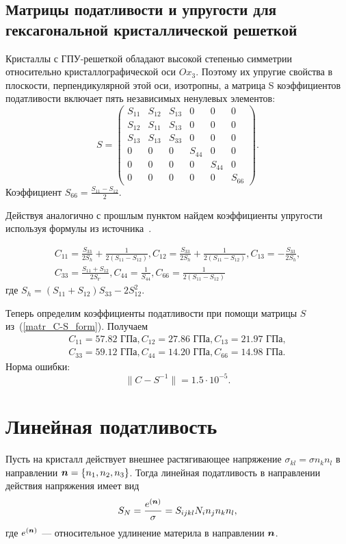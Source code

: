 \documentclass[12pt, a4paper]{article}
\renewcommand{\vec}[1]{\text{\mathversion{bold}${#1}$}}%
\begin{document}
\subsection{Матрицы податливости и упругости для гексагональной кристаллической решеткой}
 
Кристаллы с ГПУ-решеткой обладают высокой степенью симметрии относительно кристаллографической оси $Ox_3$. Поэтому их упругие свойства в плоскости, перпендикулярной этой оси, изотропны, а матрица S коэффициентов податливости включает пять независимых ненулевых элементов:
\[
S=
\begin{pmatrix}
	S_{11} & S_{12} & S_{13} & 0 & 0 & 0\\
	S_{12} & S_{11} & S_{13} & 0 & 0 & 0\\
	S_{13} & S_{13} & S_{33} & 0 & 0 & 0\\
	0 & 0 & 0 & S_{44} & 0 & 0\\
	0 & 0 & 0 & 0 & S_{44} & 0\\
	0 & 0 & 0 & 0 & 0 & S_{66} 
\end{pmatrix}.  
\]
Коэффициент $S_{66} = \frac{S_{11} - S_{12}}{2}$.

Действуя аналогично с прошлым пунктом найдем коэффициенты упругости используя формулы из источника~\cite{first-zarubin}.

\begin{gather*}
	C_{11} = \frac{S_{33}}{2 S_{h}} + \frac{1}{2 \left( S_{11} - S_{12} \right)}, 
	C_{12} = \frac{S_{33}}{2 S_{h}} + \frac{1}{2 \left( S_{11} - S_{12} \right)},
	C_{13} = -\frac{S_{33}}{2 S_{h}},\\
	C_{33} = \frac{S_{11} + S_{12}}{2 S_{Г}},
	C_{44} = \frac{1}{S_{44}},
	C_{66} = \frac{1}{2 \left( S_{11} - S_{12} \right)
	}
\end{gather*}
где $S_h = \left(S_{11} + S_{12}\right) S_{33} - 2 S_{12}^2$.

Теперь определим коэффициенты податливости при помощи матрицы $S$ из~(\ref{matr_C-S_form}). Получаем 
\begin{gather*}
	C_{11} = 57.82 \text{ ГПа},
	C_{12} = 27.86 \text{ ГПа},
	C_{13} = 21.97 \text{ ГПа},\\
	C_{33} = 59.12 \text{ ГПа},
	C_{44} = 14.20 \text{ ГПа},
	C_{66} = 14.98 \text{ ГПа}.
\end{gather*} 
Норма ошибки:
\[
\| C - S^{-1} \| = 1.5 \cdot 10^{-5}.
\]

\section{Линейная податливость}
Пусть на кристалл действует внешнее растягивающее напряжение $\sigma_{kl} = \sigma n_k n_l$ в направлении $\vec{n} = \{n_1, n_2, n_3  \}$. Тогда линейная податливость в направлении действия
напряжения имеет вид
\[
S_N = \frac{e^{(\vec{n})}}{\sigma} = S_{ijkl} N_i n_j n_k n_l,
\]
где $e^{(\vec{n})}$ --- относительное удлинение материла в направлении $\vec{n}$.
\end{document}
